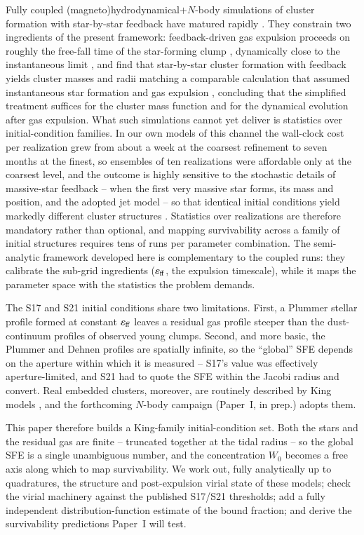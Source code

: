 \documentclass{aa}
\newcommand{\effE}{\varepsilon_{\rm ff}}
\begin{document}
Fully coupled (magneto)hydrodynamical$+$$N$-body simulations of cluster
formation with star-by-star feedback have matured rapidly
\citep[e.g.][]{Wall2019,Lahen2020,Grudic2021,Hirai2021,Fujii2021c,
Dinnbier2020}. They constrain two ingredients of the present framework:
feedback-driven gas expulsion proceeds on roughly the free-fall time of
the star-forming clump \citep{Li2019}, dynamically close to the
instantaneous limit \citep{BaumgardtKroupa2007}, and \citet{Fujii2021c}
find that star-by-star cluster formation with feedback yields cluster
masses and radii matching a comparable calculation that assumed
instantaneous star formation and gas expulsion \citep{FujiiPZ2016},
concluding that the simplified treatment suffices for the cluster mass
function and for the dynamical evolution after gas expulsion. What such
simulations cannot yet deliver is statistics over initial-condition
families. In our own models of this channel the wall-clock cost per
realization grew from about a week at the coarsest refinement to seven
months at the finest, so ensembles of ten realizations were affordable
only at the coarsest level, and the outcome is highly sensitive to the
stochastic details of massive-star feedback -- when the first very
massive star forms, its mass and position, and the adopted jet model --
so that identical initial conditions yield markedly different cluster
structures \citep{Assilkhan2026,AssilkhanJets2026,Akhmetali2026}.
Statistics over realizations are therefore mandatory rather than
optional, and mapping survivability across a family of initial structures
requires tens of runs per parameter combination. The semi-analytic
framework developed here is complementary to the coupled runs: they
calibrate the sub-grid ingredients ($\effE$, the expulsion timescale),
while it maps the parameter space with the statistics the problem
demands.

The S17 and S21 initial conditions share two limitations. First, a
Plummer stellar profile formed at constant $\effE$ leaves a residual gas
profile steeper than the dust-continuum profiles of observed young
clumps. Second, and more basic, the Plummer and Dehnen profiles are
spatially infinite, so the ``global'' SFE depends on the aperture within
which it is measured -- S17's value was effectively aperture-limited, and
S21 had to quote the SFE within the Jacobi radius and convert. Real
embedded clusters, moreover, are routinely described by King models
\citep{King1966}, and the forthcoming $N$-body campaign (Paper~I, in
prep.) adopts them.

This paper therefore builds a King-family initial-condition set. Both the
stars and the residual gas are finite -- truncated together at the
tidal radius -- so the global SFE is a single unambiguous number, and the
concentration $W_0$ becomes a free axis along which to map
survivability. We work out, fully analytically up to quadratures, the
structure and post-expulsion virial state of these models; check the
virial machinery against the published S17/S21 thresholds; add a fully
independent distribution-function estimate of the bound fraction; and
derive the survivability predictions Paper~I will test.
\end{document}
